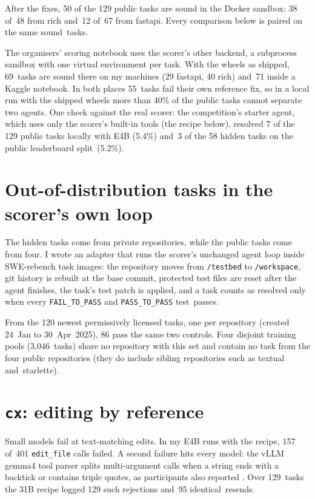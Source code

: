 After the fixes, 50 of the 129 public tasks are sound in the Docker sandbox: 38 of~48 from rich and~12 of~67 from fastapi. Every comparison below is paired on the same sound~tasks.

The organisers' scoring notebook uses the scorer's other backend, a subprocess sandbox with one virtual environment per task. With the wheels as shipped, 69~tasks are sound there on my machines (29 fastapi, 40 rich) and~71 inside a Kaggle notebook. In both places 55~tasks fail their own reference fix, so in a local run with the shipped wheels more than 40\% of the public tasks cannot separate two agents. One check against the real scorer: the competition's starter agent, which uses only the scorer's built-in tools (the recipe below), resolved 7 of the 129 public tasks locally with E4B (5.4\%) and~3 of the 58 hidden tasks on the public leaderboard split~(5.2\%).


\section{Out-of-distribution tasks in the scorer's own loop}\label{sec:ood}

The hidden tasks come from private repositories, while the public tasks come from four. I wrote an adapter that runs the scorer's unchanged agent loop inside SWE-rebench \citep{swerebench} task images: the repository moves from \texttt{/testbed} to \texttt{/workspace}, git history is rebuilt at the base commit, protected test files are reset after the agent finishes, the task's test patch is applied, and a task counts as resolved only when every \texttt{FAIL\_TO\_PASS} and \texttt{PASS\_TO\_PASS} test~passes.

From the 120 newest permissively licensed tasks, one per repository (created 24~Jan to 30~Apr~2025), 86 pass the same two controls. Four disjoint training pools (3,046~tasks) share no repository with this set and contain no task from the four public repositories (they do include sibling repositories such as textual and~starlette).


\section{\texorpdfstring{\texttt{cx}}{cx}: editing by reference}\label{sec:cx}

Small models fail at text-matching edits. In my E4B runs with the recipe, 157 of~401 \texttt{edit\_file} calls failed. A second failure hits every model: the vLLM gemma4 tool parser splits multi-argument calls when a string ends with a backtick or contains triple quotes, as participants also reported \citep{forumparser}. Over 129~tasks the 31B recipe logged 129 such rejections and~95 identical~resends.

